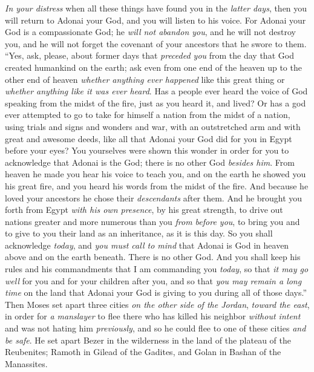 \begin{biblechapter}
\verse \textit{In your distress} when all these things have found you in the \textit{latter days}, then you will return to Adonai your God, and you will listen to his voice.
\verse For Adonai your God is a compassionate God; he \textit{will not abandon you}, and he will not destroy you, and he will not forget the covenant of your ancestors that he swore to them.
\verse “Yes, ask, please, about former days that \textit{preceded you} from the day that God created humankind on the earth; ask even from one end of the heaven up to the other end of heaven \textit{whether anything ever happened} like this great thing or \textit{whether anything like it was ever heard}.
\verse Has a people ever heard the voice of God speaking from the midst of the fire, just as you heard it, and lived?
\verse Or has a god ever attempted to go to take for himself a nation from the midst of a nation, using trials and signs and wonders and war, with an outstretched arm and with great and awesome deeds, like all that Adonai your God did for you in Egypt before your eyes?
\verse You yourselves were shown this wonder in order for you to acknowledge that Adonai is the God; there is no other God \textit{besides him}.
\verse From heaven he made you hear his voice to teach you, and on the earth he showed you his great fire, and you heard his words from the midst of the fire.
\verse And because he loved your ancestors he chose their \textit{descendants} after them. And he brought you forth from Egypt \textit{with his own presence}, by his great strength,
\verse to drive out nations greater and more numerous than you \textit{from before you}, to bring you and to give to you their land as an inheritance, as it is this day.
\verse So you shall acknowledge \textit{today}, and \textit{you must call to mind} that Adonai is God in heaven above and on the earth beneath. There is no other God.
\verse And you shall keep his rules and his commandments that I am commanding you \textit{today}, so that \textit{it may go well} for you and for your children after you, and so that \textit{you may remain a long time} on the land that Adonai your God is giving to you during all of those days.”
\verse Then Moses set apart three cities \textit{on the other side of the Jordan}, \textit{toward the east},
\verse in order for \textit{a manslayer} to flee there who has killed his neighbor \textit{without intent} and was not hating him \textit{previously}, and so he could flee to one of these cities \textit{and be safe}.
\verse He set apart Bezer in the wilderness in the land of the plateau of the Reubenites; Ramoth in Gilead of the Gadites, and Golan in Bashan of the Manassites.

\end{biblechapter}
